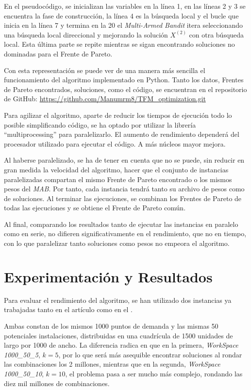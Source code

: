 \documentclass[12pt,a4paper]{book}
\begin{document}
En el pseudocódigo, se inicializan las variables en la línea 1, en las líneas 2 y 3 se encuentra la fase de construcción, la línea 4
es la búsqueda local y el bucle que inicia en la línea 7 y termina en la 20 el \textit{Multi-Armed Bandit} itera seleccionando una búsqueda local direccional
y mejorando la solución $X^{(2)}$ con otra búsqueda local. Esta última parte se repite mientras se sigan encontrando soluciones no dominadas para el Frente de Pareto.


Con esta representación se puede ver de una manera más sencilla el funcionamiento del algoritmo implementado en Python. Tanto los datos, Frentes de Pareto encontrados, soluciones, como el código, se encuentran en el repositorio de GitHub: \url{https://github.com/Manumrm8/TFM_optimization.git}

Para agilizar el algoritmo, aparte de reducir los tiempos de ejecución todo lo posible simplificando código, se ha optado por utilizar la librería ``multiprocessing'' para paralelizarlo.
El aumento de rendimiento dependerá del procesador utilizado para ejecutar el código. A más núcleos mayor mejora.

Al haberse paralelizado, se ha de tener en cuenta que no se puede, sin reducir en gran medida la velocidad del algoritmo, hacer que el conjunto de instancias paralelizadas compartan
el mismo Frente de Pareto encontrado o los mismos pesos del \textit{MAB}. Por tanto, cada instancia tendrá tanto su archivo de pesos como de soluciones. Al terminar las ejecuciones, se combinan los Frentes de Pareto de 
todas las ejecuciones y se obtiene el Frente de Pareto común.

Al final, comparando los resultados tanto de ejecutar las instancias en paralelo como en serie, no difieren significativamente en el rendimiento, que no en tiempo, con lo que paralelizar tanto soluciones como pesos no empeora 
el algoritmo.

\chapter{Experimentación y Resultados}

Para evaluar el rendimiento del algoritmo, se han utilizado dos instancias ya trabajadas tanto en el artículo \cite{k-balanced_1} como en el \cite{k-Balanced_2}. 

Ambas constan de los mismos 1000 puntos de demanda y las mismas 50 potenciales instalaciones, distribuidas en una cuadrícula de 1500 unidades de largo por 1000 de ancho.
La diferencia radica en que en la primera, \textit{WorkSpace 1000\_50\_5}, $k=5$, por lo que será más asequible encontrar soluciones al rondar las combinaciones los 2 millones, mientras que en la segunda, \textit{WorkSpace 1000\_50\_10}, $k=10$, el problema pasa a ser mucho más complejo, rondando las diez mil millones de combinaciones.
\end{document}
